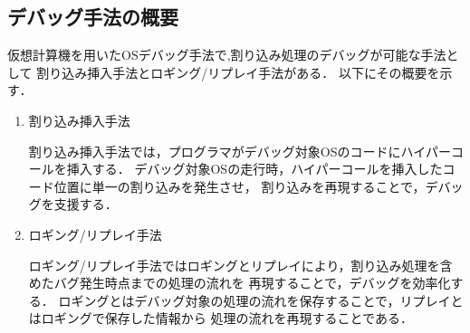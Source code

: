 \documentclass[12pt]{jsarticle}
\begin{document}
\subsection{デバッグ手法の概要}
仮想計算機を用いたOSデバッグ手法で,割り込み処理のデバッグが可能な手法として
割り込み挿入手法とロギング/リプレイ手法がある．
以下にその概要を示す．
\begin{enumerate}
\item 割り込み挿入手法

割り込み挿入手法では，プログラマがデバッグ対象OSのコードにハイパーコールを挿入する．
デバッグ対象OSの走行時，ハイパーコールを挿入したコード位置に単一の割り込みを発生させ，
割り込みを再現することで，デバッグを支援する．


\item ロギング/リプレイ手法

ロギング/リプレイ手法ではロギングとリプレイにより，割り込み処理を含めたバグ発生時点までの処理の流れを
再現することで，デバッグを効率化する．
ロギングとはデバッグ対象の処理の流れを保存することで，リプレイとはロギングで保存した情報から
処理の流れを再現することである．

\end{enumerate}
\end{document}
